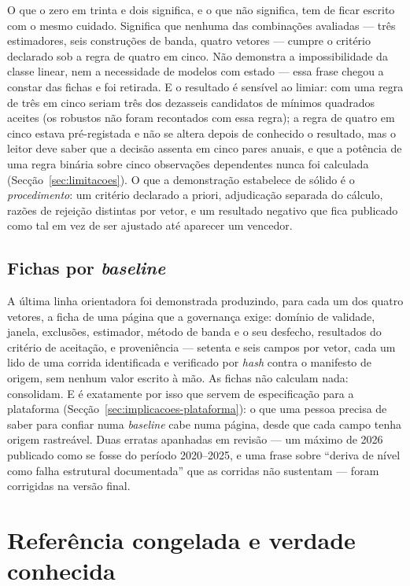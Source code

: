 O que o zero em trinta e dois significa, e o que não significa, tem de ficar
escrito com o mesmo cuidado. Significa que nenhuma das combinações avaliadas
--- três estimadores, seis construções de banda, quatro vetores --- cumpre
o critério declarado sob a regra de quatro em cinco. Não demonstra a
impossibilidade da classe linear, nem a necessidade de modelos com estado
--- essa frase chegou a constar das fichas e foi retirada. E o resultado é
sensível ao limiar: com uma regra de três em cinco seriam três dos dezasseis
candidatos de mínimos quadrados aceites (os robustos não foram recontados
com essa regra); a regra de quatro em cinco estava pré-registada e não
se altera depois de conhecido o resultado, mas o leitor deve saber que a
decisão assenta em cinco pares anuais, e que a potência de uma regra binária
sobre cinco observações dependentes nunca foi calculada (Secção~\ref{sec:limitacoes}).
O que a demonstração estabelece de sólido é o \emph{procedimento}: um
critério declarado a priori, adjudicação separada do cálculo, razões de
rejeição distintas por vetor, e um resultado negativo que fica publicado
como tal em vez de ser ajustado até aparecer um vencedor.

\subsection{Fichas por \emph{baseline}}
\label{sec:demo-fichas}

A última linha orientadora foi demonstrada produzindo, para cada um dos
quatro vetores, a ficha de uma página que a governança exige: domínio de
validade, janela, exclusões, estimador, método de banda e o seu desfecho,
resultados do critério de aceitação, e proveniência --- setenta e seis
campos por vetor, cada um lido de uma corrida identificada e verificado por
\emph{hash} contra o manifesto de origem, sem nenhum valor escrito à mão. As
fichas não calculam nada: consolidam. E é exatamente por isso que servem de
especificação para a plataforma (Secção~\ref{sec:implicacoes-plataforma}): o
que uma pessoa precisa de saber para confiar numa \emph{baseline} cabe numa
página, desde que cada campo tenha origem rastreável. Duas erratas
apanhadas em revisão --- um máximo de 2026 publicado como se fosse do
período 2020--2025, e uma frase sobre ``deriva de nível como falha estrutural
documentada'' que as corridas não sustentam --- foram corrigidas na versão
final.

\section{Referência congelada e verdade conhecida}
\label{sec:referencia-congelada}

